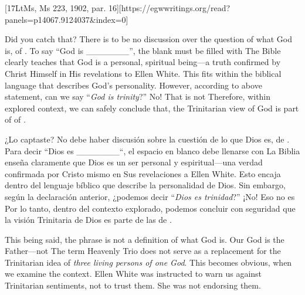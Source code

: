 [17LtMs, Ms 223, 1902, par. 16][https://egwwritings.org/read?panels=p14067.9124037&index=0]


Did you catch that? There is to be no discussion over the question of what God is,  of . To say “God is \_\_\_\_\_\_\_”, the blank must be filled with  The Bible clearly teaches that God is a personal, spiritual being—a truth confirmed by Christ Himself in His revelations to Ellen White. This fits within the biblical language that describes God’s personality. However, according to above statement, can we say “\textit{God is trinity}?” No! That is not  Therefore, within explored context, we can safely conclude that, the Trinitarian view of God is part of  of .


¿Lo captaste? No debe haber discusión sobre la cuestión de lo que Dios es,  de . Para decir “Dios es \_\_\_\_\_\_\_“, el espacio en blanco debe llenarse con  La Biblia enseña claramente que Dios es un ser personal y espiritual—una verdad confirmada por Cristo mismo en Sus revelaciones a Ellen White. Esto encaja dentro del lenguaje bíblico que describe la personalidad de Dios. Sin embargo, según la declaración anterior, ¿podemos decir “\textit{Dios es trinidad}?” ¡No! Eso no es  Por lo tanto, dentro del contexto explorado, podemos concluir con seguridad que la visión Trinitaria de Dios es parte de las  de .


This being said, the phrase  is not a definition of what God is. Our God is the Father—not  The term Heavenly Trio does not serve as a replacement for the Trinitarian idea of \textit{three living persons of one God}. This becomes obvious, when we examine the context. Ellen White was instructed to warn us against Trinitarian sentiments, not to trust them. She was not endorsing them.


